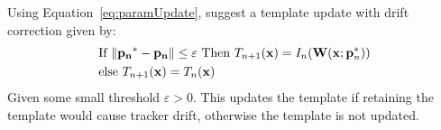   Using Equation~\ref{eq:paramUpdate}, \citeauthor{templateUpdate} suggest a template update with drift correction given by:
  \begin{align*}
    &\text{If } \norm{\mathbf{p_n}^* - \mathbf{p_n}} \leq \varepsilon \text{ Then } T_{n+1} (\mathbf{x}) = I_n(\mathbf{W}(\mathbf{x};\mathbf{p}_n^*))\\
    &\text{else } T_{n+1}(\mathbf{x}) = T_n(\mathbf{x})
  \end{align*}
  Given some small threshold $\varepsilon > 0$.
  This updates the template if retaining the template would cause tracker drift, otherwise the template is not updated.
